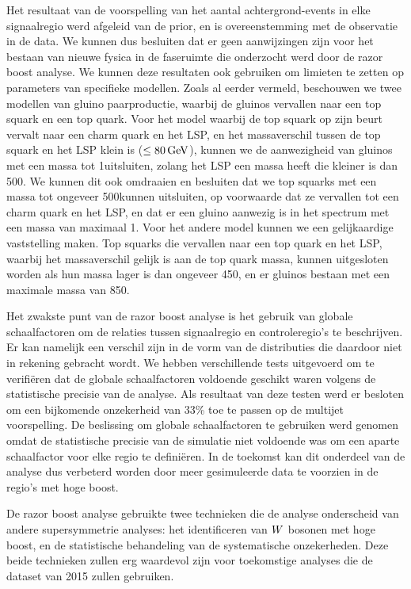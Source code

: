 Het resultaat van de voorspelling van het aantal achtergrond-events in elke signaalregio werd
afgeleid van de prior, en is overeenstemming met de observatie in de data. We kunnen dus besluiten
dat er geen aanwijzingen zijn voor het bestaan van nieuwe fysica in de faseruimte die onderzocht
werd door de razor boost analyse. We kunnen deze resultaten ook gebruiken om limieten te zetten op
parameters van specifieke modellen. Zoals al eerder vermeld, beschouwen we twee modellen van gluino
paarproductie, waarbij de gluinos vervallen naar een top squark en een top quark. Voor het model
waarbij de top squark op zijn beurt vervalt naar een charm quark en het LSP, en het massaverschil
tussen de top squark en het LSP klein is ($\leq 80\,\text{Ge\hspace{-.08em}V}$), kunnen we de aanwezigheid van gluinos met
een massa tot 1\TeV uitsluiten, zolang het LSP een massa heeft die kleiner is dan 500\GeV. We kunnen
dit ook omdraaien en besluiten dat we top squarks met een massa tot ongeveer 500\GeV kunnen
uitsluiten, op voorwaarde dat ze vervallen tot een charm quark en het LSP, en dat er een gluino
aanwezig is in het spectrum met een massa van maximaal 1\TeV. 
Voor het andere model kunnen we een gelijkaardige vaststelling maken. Top squarks die vervallen
naar een top quark en het LSP, waarbij het massaverschil gelijk is aan de top quark massa, kunnen
uitgesloten worden als hun massa lager is dan ongeveer 450\GeV, en er gluinos bestaan met een
maximale massa van 850\GeV. 

Het zwakste punt van de razor boost analyse is het gebruik van globale schaalfactoren om de
relaties tussen signaalregio en controleregio's te beschrijven. Er kan namelijk een verschil zijn
in de vorm van de distributies die daardoor niet in rekening gebracht wordt. We hebben
verschillende tests uitgevoerd om te verifi\"eren dat de globale schaalfactoren voldoende geschikt
waren volgens de statistische precisie van de analyse. Als resultaat van deze testen werd er
besloten om een bijkomende onzekerheid van 33\% toe te passen op de multijet voorspelling. De
beslissing om globale schaalfactoren te gebruiken werd genomen omdat de statistische precisie van
de simulatie niet voldoende was om een aparte schaalfactor voor elke regio te defini\"eren. In de
toekomst kan dit onderdeel van de analyse dus verbeterd worden door meer gesimuleerde data te
voorzien in de regio's met hoge boost. 

De razor boost analyse gebruikte twee technieken die de analyse onderscheid van andere
supersymmetrie analyses: het identificeren van $W$ bosonen met hoge boost, en de statistische
behandeling van de systematische onzekerheden. Deze beide technieken zullen erg waardevol zijn voor
toekomstige analyses die de dataset van 2015 zullen gebruiken. 

